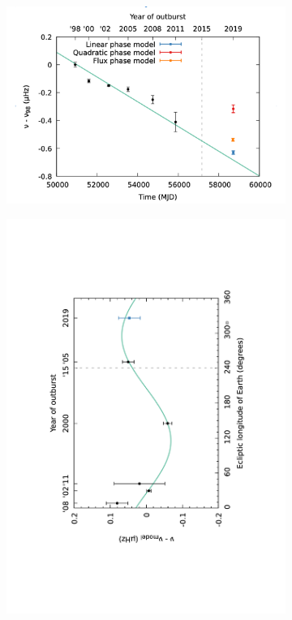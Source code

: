 \documentclass[graybox]{svmult}
\begin{document}
\begin{figure}
\begin{subfigure}{.5\textwidth}
  \centering
  \includegraphics[width=1.0\linewidth]{REVIEW_AMXP/1808_secular_3}
  \label{fig:sfig1}
\end{subfigure}%
\begin{subfigure}{.5\textwidth}
  \centering
  \includegraphics[angle=-90,width=1.3\linewidth]{REVIEW_AMXP/1808_new_pos}

\end{subfigure}
\end{figure}
\end{document}
